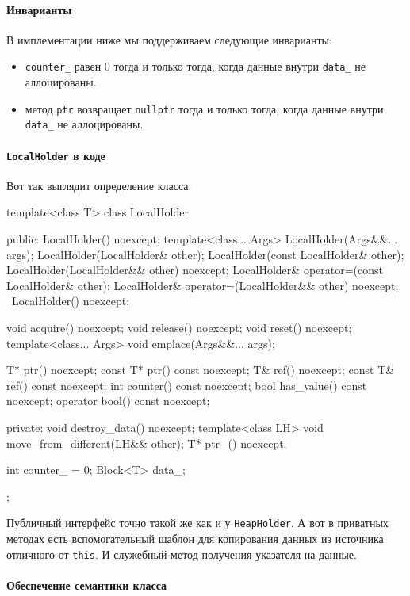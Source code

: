 \paragraph{Инварианты}

В имплементации ниже мы поддерживаем следующие инварианты:
\begin{itemize}
\item \verb"counter_" равен $0$ тогда и только тогда, когда данные внутри \verb"data_" не аллоцированы.

\item метод \verb"ptr" возвращает \verb"nullptr" тогда и только тогда, когда данные внутри \verb"data_" не аллоцированы.
\end{itemize}

\paragraph{\texttt{LocalHolder} в коде}

Вот так выглядит определение класса:
\begin{cppcode}
template<class T>
class LocalHolder {
public:
  LocalHolder() noexcept;
  template<class... Args>
  LocalHolder(Args&&... args);
  LocalHolder(LocalHolder& other);
  LocalHolder(const LocalHolder& other);
  LocalHolder(LocalHolder&& other) noexcept;
  LocalHolder& operator=(const LocalHolder& other);
  LocalHolder& operator=(LocalHolder&& other) noexcept;
  ~LocalHolder() noexcept;

  void acquire() noexcept;
  void release() noexcept;
  void reset() noexcept;
  template<class... Args>
  void emplace(Args&&... args);


  T* ptr() noexcept;
  const T* ptr() const noexcept;
  T& ref() noexcept;
  const T& ref() const noexcept;
  int counter() const noexcept;
  bool has_value() const noexcept;
  operator bool() const noexcept;

private:
  void destroy_data() noexcept;
  template<class LH>
  void move_from_different(LH&& other);
  T* ptr_() noexcept;
  
  int counter_ = 0;
  Block<T> data_;
};
\end{cppcode}
Публичный интерфейс точно такой же как и у \verb"HeapHolder".
А вот в приватных методах есть вспомогательный шаблон для копирования данных из источника отличного от \verb"this".
И служебный метод получения указателя на данные.

\paragraph{Обеспечение семантики класса}

